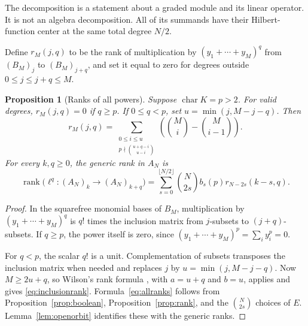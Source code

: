\documentclass[11pt]{article}
\newtheorem{proposition}[theorem]{Proposition}
\theoremstyle{definition}
\theoremstyle{remark}
\numberwithin{equation}{section}
\DeclareMathOperator{\rank}{rank}
\newcommand{\kk}{K}
\begin{document}
The decomposition is a statement about a graded module and its linear
operator. It is not an algebra decomposition. All of its summands have
their Hilbert-function center at the same total degree $N/2$.

Define $r_M(j,q)$ to be the rank of multiplication by
$(y_1+\cdots+y_M)^q$ from $(B_M)_j$ to $(B_M)_{j+q}$, and set it equal
to zero for degrees outside $0\leq j\leq j+q\leq M$.

\begin{proposition}[Ranks of all powers]\label{prop:powers}
Suppose $\operatorname{char}\kk=p>2$. For valid degrees,
$r_M(j,q)=0$ if $q\geq p$. If $0\leq q<p$, set
$u=\min(j,M-j-q)$. Then
\begin{equation}\label{eq:inclusionrank}
 r_M(j,q)=
 \sum_{\substack{0\leq i\leq u\\
              p\nmid\binom{u+q-i}{u-i}}}
       \left(\binom{M}{i}-\binom{M}{i-1}\right).
\end{equation}
For every $k,q\geq0$, the generic rank in $A_N$ is
\begin{equation}\label{eq:allranks}
 \rank\bigl(\ell^q:(A_N)_k\to(A_N)_{k+q}\bigr)
 =\sum_{s=0}^{\lfloor N/2\rfloor}
      \binom{N}{2s}b_s(p)r_{N-2s}(k-s,q).
\end{equation}
\end{proposition}

\begin{proof}
In the squarefree monomial bases of $B_M$, multiplication by
$(y_1+\cdots+y_M)^q$ is $q!$ times the inclusion matrix from $j$-subsets
to $(j+q)$-subsets. If $q\geq p$, the power itself is zero, since
$(y_1+\cdots+y_M)^p=\sum_i y_i^p=0$.

For $q<p$, the scalar $q!$ is a unit. Complementation of subsets
transposes the inclusion matrix when needed and replaces $j$ by
$u=\min(j,M-j-q)$. Now $M\geq 2u+q$, so Wilson's rank formula
\cite[Theorem~4.1]{Frankl}, with $a=u+q$ and $b=u$, applies and gives
\eqref{eq:inclusionrank}. Formula~\eqref{eq:allranks} follows from
Proposition~\ref{prop:boolean}, Proposition~\ref{prop:rank}, and the
$\binom{N}{2s}$ choices of $E$. Lemma~\ref{lem:openorbit} identifies
these with the generic ranks.
\end{proof}
\end{document}
